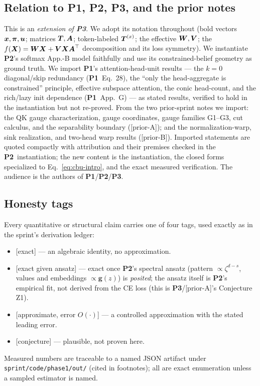 \documentclass{article}
\newcommand{\gb}{\boldsymbol{g}}
\newcommand{\htag}[1]{{\normalfont\sffamily\footnotesize[#1]}}
\newcommand{\Pone}{\textbf{P1}}
\newcommand{\Ptwo}{\textbf{P2}}
\newcommand{\Pthree}{\textbf{P3}}
\newcommand{\priorA}{\textsf{[prior-A]}}
\newcommand{\priorB}{\textsf{[prior-B]}}
\begin{document}
\subsection{Relation to \Pone, \Ptwo, \Pthree, and the prior notes}

This is an \emph{extension of \Pthree}. We adopt its notation throughout (bold
vectors $\boldsymbol{x},\boldsymbol{\pi},\boldsymbol{u}$; matrices $\boldsymbol{T},\boldsymbol{A}$; token-labeled $\boldsymbol{T}^{(x)}$; the effective
$\boldsymbol{W},\boldsymbol{V}$; the $f(\boldsymbol{X})=\boldsymbol{W}\boldsymbol{X}+\boldsymbol{V}\boldsymbol{X}\boldsymbol{A}^\top$ decomposition and its loss symmetry).
We instantiate \Ptwo's softmax App.-B model faithfully and use its
constrained-belief geometry as ground truth. We import \Pone's
attention-head-unit results --- the $k{=}0$ diagonal/skip redundancy (\Pone\
Eq.~28), the ``only the head-aggregate is constrained'' principle, effective
subspace attention, the conic head-count, and the rich/lazy init dependence
(\Pone\ App.~G) --- as stated results, verified to hold in the instantiation but
not re-proved. From the two prior-sprint notes we import: the QK gauge
characterization, gauge coordinates, gauge families G1--G3, cut calculus, and the
separability boundary (\priorA); and the normalization-warp, sink realization, and
two-head warp results (\priorB). Imported statements are quoted compactly with
attribution and their premises checked in the \Ptwo\ instantiation; the new content
is the instantiation, the closed forms specialized to Eq.~\eqref{eq:cbu-intro}, and
the exact measured verification. The audience is the authors of \Pone/\Ptwo/\Pthree.

\subsection{Honesty tags}\label{sec:tags}

Every quantitative or structural claim carries one of four tags, used exactly as in
the sprint's derivation ledger:
\begin{itemize}
\item \htag{exact} --- an algebraic identity, no approximation.
\item \htag{exact given ansatz} --- exact once \Ptwo's spectral ansatz (pattern
$\propto\zeta^{d-s}$, values and embeddings $\propto\gb(z)$) is \emph{posited}; the
ansatz itself is \Ptwo's empirical fit, not derived from the CE loss (this is
\Pthree/\priorA's Conjecture Z1).
\item \htag{approximate, error $O(\cdot)$} --- a controlled approximation with the
stated leading error.
\item \htag{conjecture} --- plausible, not proven here.
\end{itemize}
Measured numbers are traceable to a named JSON artifact under
\texttt{sprint/code/phase1/out/} (cited in footnotes); all are exact enumeration
unless a sampled estimator is named.
\end{document}
